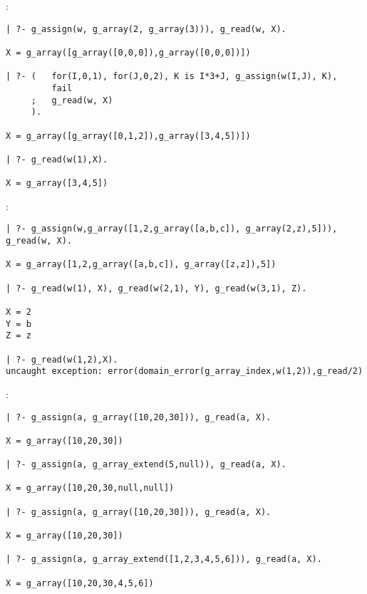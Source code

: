 :

\begin{Indentation}
\begin{verbatim}
| ?- g_assign(w, g_array(2, g_array(3))), g_read(w, X).

X = g_array([g_array([0,0,0]),g_array([0,0,0])])

| ?- (   for(I,0,1), for(J,0,2), K is I*3+J, g_assign(w(I,J), K),
         fail
     ;   g_read(w, X)
     ).

X = g_array([g_array([0,1,2]),g_array([3,4,5])])

| ?- g_read(w(1),X).

X = g_array([3,4,5])
\end{verbatim}
\end{Indentation}

:

\begin{Indentation}
\begin{verbatim}
| ?- g_assign(w,g_array([1,2,g_array([a,b,c]), g_array(2,z),5])), g_read(w, X).

X = g_array([1,2,g_array([a,b,c]), g_array([z,z]),5])

| ?- g_read(w(1), X), g_read(w(2,1), Y), g_read(w(3,1), Z).

X = 2
Y = b
Z = z

| ?- g_read(w(1,2),X).
uncaught exception: error(domain_error(g_array_index,w(1,2)),g_read/2)
\end{verbatim}
\end{Indentation}

:

\begin{Indentation}
\begin{verbatim}
| ?- g_assign(a, g_array([10,20,30])), g_read(a, X).

X = g_array([10,20,30])

| ?- g_assign(a, g_array_extend(5,null)), g_read(a, X).

X = g_array([10,20,30,null,null])

| ?- g_assign(a, g_array([10,20,30])), g_read(a, X).

X = g_array([10,20,30])

| ?- g_assign(a, g_array_extend([1,2,3,4,5,6])), g_read(a, X).

X = g_array([10,20,30,4,5,6])
\end{verbatim}
\end{Indentation}

